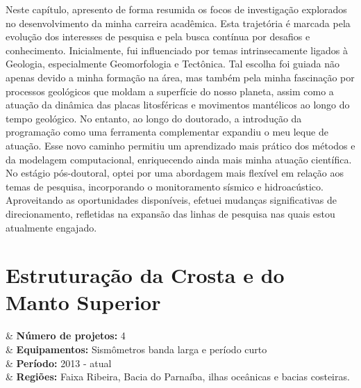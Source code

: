 \documentclass[10pt,a4paper,oneside]{book}
\begin{document}
Neste capítulo, apresento de forma resumida os focos de investigação explorados no desenvolvimento da minha carreira acadêmica. Esta trajetória é marcada pela evolução dos interesses de pesquisa e pela busca contínua por desafios e conhecimento. Inicialmente, fui influenciado por temas intrinsecamente ligados à Geologia, especialmente Geomorfologia e Tectônica. Tal escolha foi guiada não apenas devido a minha formação na área, mas também pela minha fascinação por processos geológicos que moldam a superfície do nosso planeta, assim como a atuação da dinâmica das placas litosféricas e movimentos mantélicos ao longo do tempo geológico. No entanto, ao longo do doutorado, a introdução da programação como uma ferramenta complementar expandiu o meu leque de atuação. Esse novo caminho permitiu um aprendizado mais prático dos métodos e da modelagem computacional, enriquecendo ainda mais minha atuação científica. No estágio pós-doutoral, optei por uma abordagem mais flexível em relação aos temas de pesquisa, incorporando o monitoramento sísmico e hidroacústico. Aproveitando as oportunidades disponíveis, efetuei mudanças significativas de direcionamento, refletidas na expansão das linhas de pesquisa nas quais estou atualmente engajado. 

\section{Estruturação da Crosta e do Manto Superior}

\begin{summarybox}[frametitle=\faProjectDiagram{}\quad Panorama da linha de pesquisa]
	\begin{datelist}
		\faFile* & \textbf{Número de projetos:} 4 \\
		\faBinoculars & \textbf{Equipamentos:} Sismômetros banda larga e período curto \\
		\faCalendar*[regular] & \textbf{Período:} 2013 - atual \\
		\faMapMarked* & \textbf{Regiões:} Faixa Ribeira, Bacia do Parnaíba, ilhas oceânicas e bacias costeiras. \\
	\end{datelist}
\end{summarybox}

\bigskip
\end{document}
